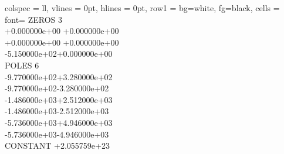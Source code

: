 \begin{longtblr}{
		colspec = {ll},
		vlines  = 0pt,
		hlines  = 0pt,
		row{1}  = {bg=white, fg=black},
		cells = {font=\ttfamily}
	}
	 ZEROS 3 \\
	 \hspace{1cm}+0.000000e+00 +0.000000e+00 \\
	 \hspace{1cm}+0.000000e+00 +0.000000e+00 \\
	 \hspace{1cm}-5.150000e+02+0.000000e+00 \\
	 POLES 6 \\
	 \hspace{1cm}-9.770000e+02+3.280000e+02 \\
	 \hspace{1cm}-9.770000e+02-3.280000e+02 \\
	 \hspace{1cm}-1.486000e+03+2.512000e+03 \\
	 \hspace{1cm}-1.486000e+03-2.512000e+03 \\
	 \hspace{1cm}-5.736000e+03+4.946000e+03 \\
	 \hspace{1cm}-5.736000e+03-4.946000e+03 \\
	 CONSTANT +2.055759e+23 \\
\end{longtblr}
